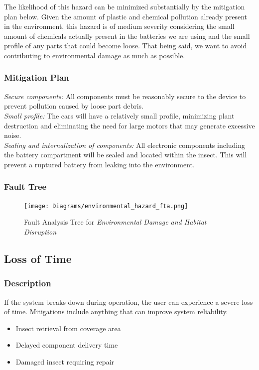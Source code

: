 \documentclass[11pt]{article}
\begin{document}
 The likelihood of this hazard can be minimized substantially by the mitigation plan below. Given the amount of plastic and chemical pollution already present in the environment, this hazard is of medium severity considering the small amount of chemicals actually present in the batteries we are using and the small profile of any parts that could become loose. That being said, we want to avoid contributing to environmental damage as much as possible.

\subsubsection*{Mitigation Plan}
\textit{Secure components:} All components must be reasonably secure to the device to prevent pollution caused by loose part debris. \\
\textit{Small profile:} The cars will have a relatively small profile, minimizing plant destruction and eliminating the need for large motors that may generate excessive noise. \\
\textit{Sealing and internalization of components:} All electronic components including the battery compartment will be sealed and located within the insect. This will prevent a ruptured battery from leaking into the environment.

\subsubsection*{Fault Tree}
\begin{figure}[H]
   \centering
   \texttt{[image: Diagrams/environmental\_hazard\_fta.png]}
   \caption{Fault Analysis Tree for \textit{Environmental Damage and Habitat Disruption}}
   \label{fig:ft-Environment}
\end{figure}

\subsection{Loss of Time}
\subsubsection*{Description}
If the system breaks down during operation, the user can experience a severe loss of time. Mitigations include anything
that can improve system reliability.

\begin{itemize}
\item Insect retrieval from coverage area
\item Delayed component delivery time
\item Damaged insect requiring repair
\end{itemize}
\end{document}
